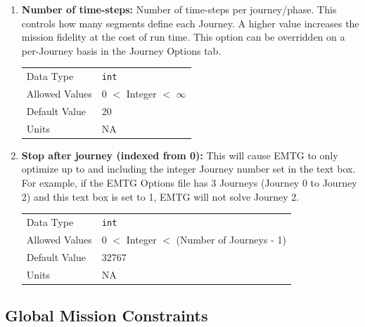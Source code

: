 \begin{enumerate}
    \item \textbf{Number of time-steps:} Number of time-steps per journey/phase. This controls how many segments define each Journey. A higher value increases the mission fidelity at the cost of run time. This option can be overridden on a per-Journey basis in the Journey Options tab.
    
        \begin{table}[H]
            \hspace{2cm}
            \begin{tabular}{ll}
            Data Type & \verb|int| \\
            Allowed Values & 0 $<$ Integer $<$ $\infty$ \\
            Default Value & 20 \\
            Units & NA
            \end{tabular}
        \end{table}
        
    \item \textbf{Stop after journey (indexed from 0):} This will cause \ac{EMTG} to only optimize up to and including the integer Journey number set in the text box. For example, if the \ac{EMTG} Options file has 3 Journeys (Journey 0 to Journey 2) and this text box is set to 1, \ac{EMTG} will not solve Journey 2.

        \begin{table}[H]
            \hspace{2cm}
            \begin{tabular}{ll}
            Data Type & \verb|int| \\
            Allowed Values & 0 $<$ Integer $<$ (Number of Journeys - 1) \\
            Default Value & 32767 \\
            Units & NA
            \end{tabular}
        \end{table}
    

\end{enumerate}
    
\subsection{Global Mission Constraints}

